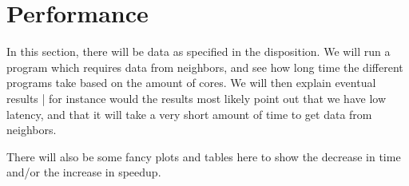 \section{Performance}


In this section, there will be data as specified in the disposition. We will run
a program which requires data from neighbors, and see how long time the
different programs take based on the amount of cores. We will then explain
eventual results | for instance would the results most likely point out that we
have low latency, and that it will take a very short amount of time to get data
from neighbors.

There will also be some fancy plots and tables here to show the decrease in time
and/or the increase in speedup.
